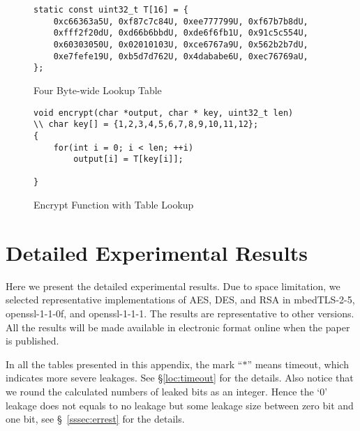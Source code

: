 \begin{figure}[h!]
    \centering
    \begin{lstlisting}[xleftmargin=.02\textwidth,xrightmargin=.01\textwidth]
static const uint32_t T[16] = {
    0xc66363a5U, 0xf87c7c84U, 0xee777799U, 0xf67b7b8dU,
    0xfff2f20dU, 0xd66b6bbdU, 0xde6f6fb1U, 0x91c5c554U,
    0x60303050U, 0x02010103U, 0xce6767a9U, 0x562b2b7dU,
    0xe7fefe19U, 0xb5d7d762U, 0x4dababe6U, 0xec76769aU,
};
    \end{lstlisting}
    \caption{Four Byte-wide Lookup Table}
    \label{fig:four_byte_table}
\end{figure}



\begin{figure}[h!]
    \centering
    \begin{lstlisting}[xleftmargin=.02\textwidth,xrightmargin=.01\textwidth]
void encrypt(char *output, char * key, uint32_t len)
\\ char key[] = {1,2,3,4,5,6,7,8,9,10,11,12};
{
    for(int i = 0; i < len; ++i)
        output[i] = T[key[i]];

}
    \end{lstlisting}
    \caption{Encrypt Function with Table Lookup}
    \label{fig:table_lookup}
\end{figure}



\section{Detailed Experimental Results}
\label{sec:result-table}

Here we present the detailed experimental results.
Due to space limitation, we selected representative implementations of
AES, DES, and RSA in
mbedTLS-2-5,
openssl-1-1-0f,  and
openssl-1-1-1.
The results are representative to other versions.
All the results will be made available in electronic format online
when the paper is published. %

In all the tables presented in this appendix, the mark ``$*$'' means timeout,
which indicates more severe leakages. See \S\ref{loc:timeout} for the details.
Also notice that we round the calculated numbers of leaked bits as an integer.
Hence the `0' leakage does not equals to no leakage but some leakage size
between zero bit and one bit, see \S~\ref{sssec:errest} for the details.


